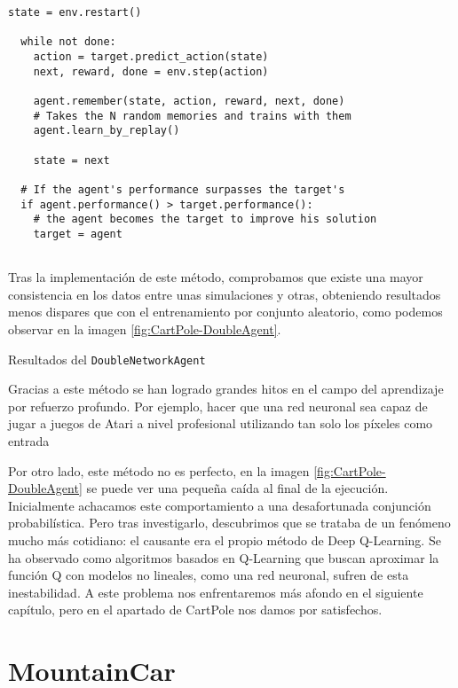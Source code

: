 \begin{minipage}{0.9\linewidth}%
\begin{lstlisting}[frame=tb, caption=Pseudocódigo DoubleAgent, inputencoding=latin1, label=code:cartpole_drl4]
  state = env.restart()

  while not done:
    action = target.predict_action(state)
    next, reward, done = env.step(action)

    agent.remember(state, action, reward, next, done)
    # Takes the N random memories and trains with them
    agent.learn_by_replay()

    state = next

  # If the agent's performance surpasses the target's
  if agent.performance() > target.performance():
    # the agent becomes the target to improve his solution
    target = agent
        
\end{lstlisting}%
\end{minipage}

Tras la implementación de este método, comprobamos que existe una mayor consistencia en los datos entre unas simulaciones y otras, obteniendo resultados menos dispares que con el entrenamiento por conjunto aleatorio, como podemos observar en la imagen \ref{fig:CartPole-DoubleAgent}.

%
       {Resultados del \texttt{DoubleNetworkAgent}}

Gracias a este método se han logrado grandes hitos en el campo del aprendizaje por refuerzo profundo. Por ejemplo, hacer que una red neuronal sea capaz de jugar a juegos de Atari a nivel profesional utilizando tan solo los píxeles como entrada \citep{mnih2013playing}

Por otro lado, este método no es perfecto, en la imagen \ref{fig:CartPole-DoubleAgent} se puede ver una pequeña caída al final de la ejecución. Inicialmente achacamos este comportamiento a una desafortunada conjunción probabilística. Pero tras investigarlo, descubrimos que se trataba de un fenómeno mucho más cotidiano: el causante era el propio método de Deep Q-Learning. Se ha observado como algoritmos basados en Q-Learning que buscan aproximar la función Q con modelos no lineales, como una red neuronal, sufren de esta inestabilidad. A este problema nos enfrentaremos más afondo en el siguiente capítulo, pero en el apartado de CartPole nos damos por satisfechos. 

\section{MountainCar}

